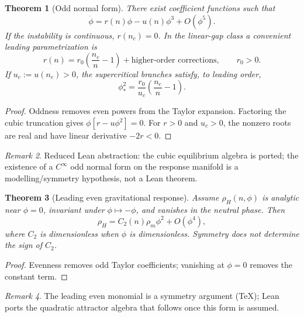 \documentclass[11pt]{article}
\newtheorem{theorem}{Theorem}[section]
\theoremstyle{definition}
\theoremstyle{remark}
\newtheorem{remark}[theorem]{Remark}
\begin{document}
\begin{theorem}[Odd normal form]
\label{thm:odd-normal}
There exist coefficient functions such that
\begin{equation}
\dot\phi=r(n)\phi-u(n)\phi^3+O(\phi^5).
\end{equation}
If the instability is continuous, $r(n_c)=0$.
In the linear-gap class a convenient leading parametrization is
\begin{equation}
\boxed{r(n)=r_0\left(\frac{n_c}{n}-1\right)+\text{higher-order corrections},\qquad r_0>0.}
\end{equation}
If $u_c:=u(n_c)>0$, the supercritical branches satisfy, to leading order,
\begin{equation}
\boxed{\phi_*^2=\frac{r_0}{u_c}\left(\frac{n_c}{n}-1\right).}
\end{equation}
\end{theorem}

\begin{proof}
Oddness removes even powers from the Taylor expansion.
Factoring the cubic truncation gives $\phi[r-u\phi^2]=0$.
For $r>0$ and $u_c>0$, the nonzero roots are real and have linear derivative $-2r<0$.
\end{proof}
\begin{remark}
\label{rem:odd-normal-lean}
Reduced Lean abstraction: the cubic equilibrium algebra is ported; the existence of a $C^\infty$ odd normal form on the response manifold is a modelling/symmetry hypothesis, not a Lean theorem.
\end{remark}

\begin{theorem}[Leading even gravitational response]
\label{thm:even-coupling}
Assume $\rho_H(n,\phi)$ is analytic near $\phi=0$, invariant under $\phi\mapsto-\phi$, and vanishes in the neutral phase.
Then
\begin{equation}
\boxed{\rho_H=C_2(n)\rho_m\phi^2+O(\phi^4),}
\end{equation}
where $C_2$ is dimensionless when $\phi$ is dimensionless.
Symmetry does not determine the sign of $C_2$.
\end{theorem}

\begin{proof}
Evenness removes odd Taylor coefficients; vanishing at $\phi=0$ removes the constant term.
\end{proof}
\begin{remark}
\label{rem:even-coupling-lean}
The leading even monomial is a symmetry argument (TeX); Lean ports the quadratic attractor algebra that follows once this form is assumed.
\end{remark}
\end{document}
